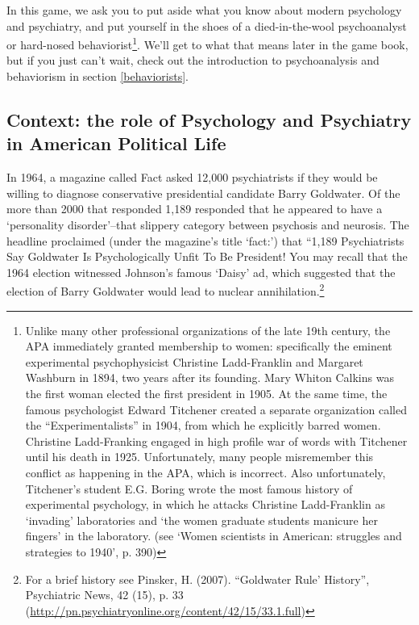 \begin{refsection}
In this game, we ask you to put aside what you know about modern psychology and psychiatry, and put yourself in the shoes of a died-in-the-wool psychoanalyst or hard-nosed behaviorist\footnote{Unlike many other professional organizations of the late 19th century, the APA immediately granted membership to women: specifically the eminent experimental psychophysicist Christine Ladd-Franklin and Margaret Washburn in 1894, two years after its founding. Mary Whiton Calkins was the first woman elected the first president in 1905.⁠
At the same time, the famous psychologist Edward Titchener created a separate organization called the “Experimentalists” in 1904, from which he explicitly barred women. Christine Ladd-Franking engaged in high profile war of words with Titchener until his death in 1925. Unfortunately, many people misremember this conflict as happening in the APA, which is incorrect. Also unfortunately, Titchener's student E.G. Boring wrote the most famous history of experimental psychology, in which he attacks Christine Ladd-Franklin as `invading' laboratories and `the women graduate students manicure her fingers' in the laboratory. (see `Women scientists in American: struggles and strategies to 1940', p. 390)}. We’ll get to what that means later in the game book, but if you just can’t wait, check out the introduction to psychoanalysis and behaviorism in section \ref{behaviorists}.

\subsection{Context: the role of Psychology and Psychiatry in American Political Life}
\label{context:theroleofpsychologyandpsychiatryinamericanpoliticallife}

In 1964, a magazine called Fact asked 12,000 psychiatrists if they would be willing to diagnose conservative presidential candidate Barry Goldwater. Of the more than 2000 that responded 1,189 responded that he appeared to have a `personality disorder'--that slippery category between psychosis and neurosis. The headline proclaimed (under the magazine's title `fact:') that “1,189 Psychiatrists Say Goldwater Is Psychologically Unfit To Be President! You may recall that the 1964 election witnessed Johnson's famous `Daisy' ad, which suggested that the election of Barry Goldwater would lead to nuclear annihilation.\footnote{For a brief history see Pinsker, H. (2007). “Goldwater Rule' History”, Psychiatric News, 42 (15), p. 33 (\url{http://pn.psychiatryonline.org/content/42/15/33.1.full})} \begin{marginfigure}
 \begin{center}


\end{center}
\end{marginfigure}
\end{refsection}
